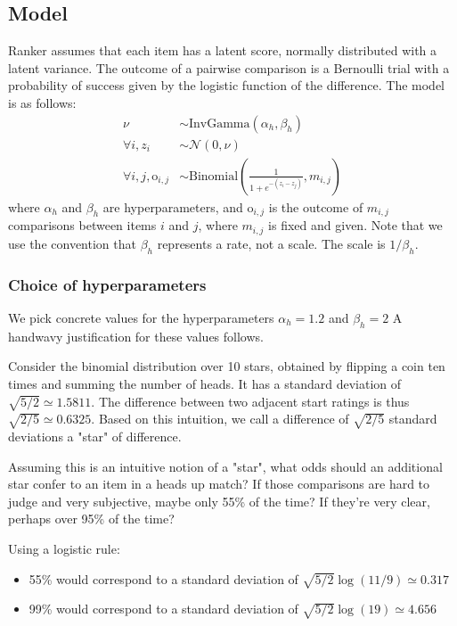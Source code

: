 \documentclass[12pt]{article}
\begin{document}
\subsection{Model}
    Ranker assumes that each item has a latent score, normally distributed with a latent
    variance. The outcome of a pairwise comparison is a Bernoulli trial with a probability
    of success given by the logistic function of the difference. The model is as follows:
    \begin{equation}
        \begin{aligned}
            \nu &\sim \text{InvGamma}(\alpha_h, \beta_h) \\
            \forall i, z_i &\sim \mathcal{N}(0, \nu) \\
            \forall i, j, \text{o}_{i,j} &\sim \text{Binomial}\left(\frac{1}{1 + e^{-(z_i - z_j)}}, m_{i,j}\right)
        \end{aligned}
    \end{equation}
    where $\alpha_h$ and $\beta_h$ are hyperparameters, and $\text{o}_{i,j}$ is the outcome of $m_{i,j}$ comparisons
    between items $i$ and $j$, where $m_{i,j}$ is fixed and given. Note that we use the convention that $\beta_h$ represents
    a rate, not a scale. The scale is $1 / \beta_h$.

    \subsubsection{Choice of hyperparameters}
    We pick concrete values for the hyperparameters $\alpha_h = 1.2$ and $\beta_h = 2$
    A handwavy justification for these values follows.

    Consider the binomial distribution over 10 stars, obtained by flipping a coin
    ten times and summing the number of heads. It has a standard deviation of
    $\sqrt{5/2} \simeq 1.5811$. The difference between two adjacent start ratings is thus
    $\sqrt{2/5} \simeq 0.6325$. Based on this intuition, we call a difference of $\sqrt{2/5}$ standard deviations
    a "star" of difference.

    Assuming this is an intuitive notion of a "star", what odds
    should an additional star confer to an item in a heads up match?
    If those comparisons are hard to judge and very subjective, maybe only 55\% of the time?
    If they're very clear, perhaps over 95\% of the time?

    Using a logistic rule:
    \begin{itemize}
    \item 55\% would correspond to a standard deviation of $\sqrt{5/2} \log(11/9) \simeq 0.317$
    \item 99\% would correspond to a standard deviation of $\sqrt{5/2} \log(19) \simeq 4.656$
    \end{itemize}
\end{document}
